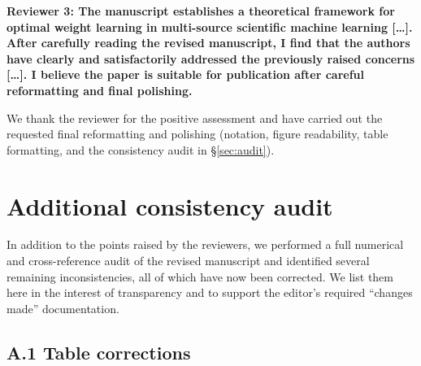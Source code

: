 \documentclass{article}
\newenvironment{QandA}{\begin{enumerate}[label=\bfseries\alph*.]\bfseries}
                      {\end{enumerate}}
\newenvironment{answered}{\par\normalfont}{}
\begin{document}
\begin{QandA}
Reviewer 3: The manuscript establishes a theoretical framework for optimal weight learning in multi-source scientific machine learning [\ldots]. After carefully reading the revised manuscript, I find that the authors have clearly and satisfactorily addressed the previously raised concerns [\ldots]. I believe the paper is suitable for publication after careful reformatting and final polishing.
\end{QandA}

\begin{answered}
    We thank the reviewer for the positive assessment and have carried out the
    requested final reformatting and polishing (notation, figure readability,
    table formatting, and the consistency audit in \S\ref{sec:audit}).
\end{answered}

\section*{Additional consistency audit}
\label{sec:audit}

In addition to the points raised by the reviewers, we performed a full
numerical and cross-reference audit of the revised manuscript and identified
several remaining inconsistencies, all of which have now been corrected. We
list them here in the interest of transparency and to support the editor's
required ``changes made'' documentation.

\subsection*{A.1 Table corrections}
\end{document}

